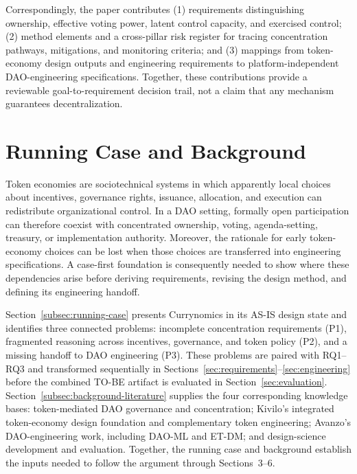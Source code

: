 \documentclass[referee,sn-basic]{sn-jnl}
\begin{document}
Correspondingly, the paper contributes (1) requirements distinguishing
ownership, effective voting power, latent control capacity, and exercised control;
(2) method elements and a cross-pillar risk register for tracing concentration
pathways, mitigations, and monitoring criteria; and (3) mappings from
token-economy design outputs and engineering requirements to
platform-independent DAO-engineering specifications. Together, these contributions provide a reviewable
goal-to-requirement decision trail, not a claim that any mechanism guarantees
decentralization.

\section{Running Case and Background}\label{sec:foundations}

Token economies are sociotechnical systems in which apparently local choices
about incentives, governance rights, issuance, allocation, and execution can
redistribute organizational control. In a DAO setting, formally open
participation can therefore coexist with concentrated ownership, voting,
agenda-setting, treasury, or implementation authority. Moreover, the rationale
for early token-economy choices can be lost when those choices are transferred
into engineering specifications. A case-first foundation is consequently
needed to show where these dependencies arise before deriving requirements,
revising the design method, and defining its engineering handoff.

Section~\ref{subsec:running-case} presents Currynomics in its AS-IS design state
and identifies three connected problems: incomplete concentration requirements
(P1), fragmented reasoning across incentives, governance, and token policy
(P2), and a missing handoff to DAO engineering (P3). These problems are paired
with RQ1--RQ3 and transformed sequentially in
Sections~\ref{sec:requirements}--\ref{sec:engineering} before the combined
TO-BE artifact is evaluated in Section~\ref{sec:evaluation}.
Section~\ref{subsec:background-literature} supplies the four corresponding
knowledge bases: token-mediated DAO governance and concentration; Kivilo's
integrated token-economy design foundation and complementary token engineering;
Avanzo's DAO-engineering work, including DAO-ML and ET-DM; and design-science
development and evaluation. Together, the running case and background establish
the inputs needed to follow the argument through Sections~3--6.
\end{document}
